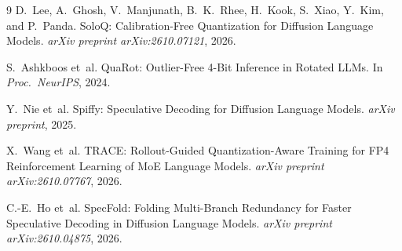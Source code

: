 \documentclass[11pt,a4paper]{article}
\begin{document}
\begin{thebibliography}{9}
D.~Lee, A.~Ghosh, V.~Manjunath, B.~K.~Rhee, H.~Kook, S.~Xiao, Y.~Kim, and P.~Panda.
\newblock SoloQ: Calibration-Free Quantization for Diffusion Language Models.
\newblock \emph{arXiv preprint arXiv:2610.07121}, 2026.

S.~Ashkboos et~al.
\newblock QuaRot: Outlier-Free 4-Bit Inference in Rotated LLMs.
\newblock In \emph{Proc.\ NeurIPS}, 2024.

Y.~Nie et~al.
\newblock Spiffy: Speculative Decoding for Diffusion Language Models.
\newblock \emph{arXiv preprint}, 2025.

X.~Wang et~al.
\newblock TRACE: Rollout-Guided Quantization-Aware Training for FP4 Reinforcement Learning of MoE Language Models.
\newblock \emph{arXiv preprint arXiv:2610.07767}, 2026.

C.-E.~Ho et~al.
\newblock SpecFold: Folding Multi-Branch Redundancy for Faster Speculative Decoding in Diffusion Language Models.
\newblock \emph{arXiv preprint arXiv:2610.04875}, 2026.
\end{thebibliography}
\end{document}
